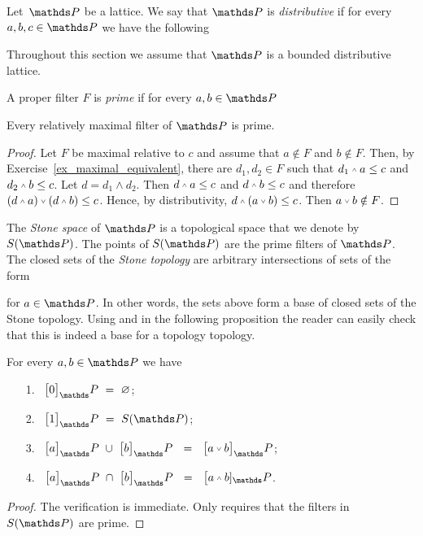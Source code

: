 \documentclass[creche.tex]{subfiles}
\begin{document}
Let\ $\PP$ be a lattice. We say that $\PP$ is \emph{distributive\/} if for every $a,b,c\in\PP$ we have the following



Throughout this section we assume that $\PP$ is a bounded distributive lattice.

A proper filter $F$ is \emph{prime\/} if for every $a,b\in\PP$


\begin{proposition}\label{prop_massimalisonoprimi}
Every relatively maximal filter of\/ $\PP$ is prime.
\end{proposition}

\begin{proof}
Let $F$ be maximal relative to $c$ and assume that $a\notin F$ and $b\notin F$. Then, by Exercise~\ref{ex_maximal_equivalent}, there are $d_1, d_2\in F$ such that $d_1\swedge a\le c$ and $d_2\swedge b\le c$. Let $d=d_1\wedge d_2$. Then  $d\swedge a\le c$ and $d\swedge b\le c$ and therefore $(d\swedge a)\svee(d\swedge b)\le c$. Hence, by distributivity, $d\swedge (a\svee b)\le c$. Then $a\svee b\notin F$.
\end{proof}

The \emph{Stone space\/} of $\PP$ is a topological space that we denote by \emph{$S(\PP)$}. The points of \emph{$S(\PP)$} are the prime filters of $\PP$. The closed sets of the \emph{Stone topology} are arbitrary intersections of sets of the form


for $a\in\PP$. In other words, the sets above form a base of closed sets of the Stone topology. Using  and  in the following proposition the reader can easily check that this is indeed a base for a topology topology.

\begin{proposition}\label{prop_brouwerstopology}
For every $a,b\in\PP$ we have
\begin{itemize}
\item[1.]\ $\big[0\big]_\PP\ =\ \0$;
\item[2.]\ $\big[1\big]_\PP\ =\ S(\PP)$;
\item[3.]\ $\big[a\big]_\PP\ \cup\ \big[b\big]_\PP\ \ =\ \ \big[a\svee b\big]_\PP$;
\item[4.]\ $\big[a\big]_\PP\ \cap\ \big[b\big]_\PP\ \ =\ \ \big[a\swedge b]_\PP$.
\end{itemize}
\end{proposition}
\begin{proof}
The verification is immediate. Only  requires that the filters in $S(\PP)$ are prime.
\end{proof}
\end{document}
